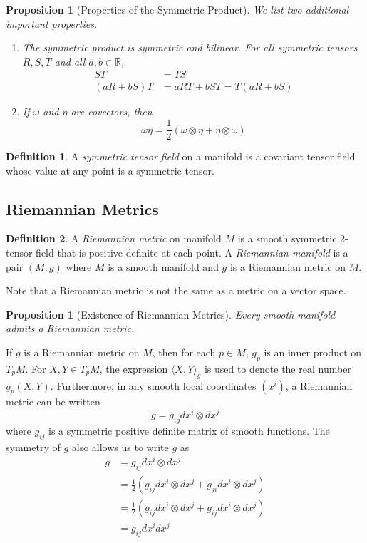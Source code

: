 \documentclass{article}
\newtheorem{proposition}[theorem]{Proposition}
\theoremstyle{remark}
\theoremstyle{definition}
\newtheorem{definition}{Definition}[section]
\begin{document}
\begin{proposition}[Properties of the Symmetric Product]
We list two additional important properties. 
\begin{enumerate}
    \item The symmetric product is symmetric and bilinear. For all symmetric tensors $R, S, T$ and all $a, b \in \mathbb{R}$, 
    \begin{align*}
        ST & = TS \\
        (a R + b S) T & = a RT + b ST= T (a R + bS) 
    \end{align*}
    \item If $\omega$ and $\eta$ are covectors, then 
    \[\omega \eta = \frac{1}{2} (\omega \otimes \eta + \eta \otimes \omega)\]
\end{enumerate}
\end{proposition}

\begin{definition}
A \textit{symmetric tensor field} on a manifold is a covariant tensor field whose value at any point is a symmetric tensor. 
\end{definition}

\subsection{Riemannian Metrics}
\begin{definition}
A \textit{Riemannian metric} on manifold $M$ is a smooth symmetric 2-tensor field that is positive definite at each point. A \textit{Riemannian manifold} is a pair $(M, g)$ where $M$ is a smooth manifold and $g$ is a Riemannian metric on $M$. 
\end{definition}

Note that a Riemannian metric is not the same as a metric on a vector space. 

\begin{proposition}[Existence of Riemannian Metrics]
Every smooth manifold admits a Riemannian metric. 
\end{proposition}

If $g$ is a Riemannian metric on $M$, then for each $p \in M$, $g_p$ is an inner product on $T_p M$. For $X, Y \in T_p M$, the expression $\langle X, Y \rangle_g$ is used to denote the real number $g_p (X, Y)$. Furthermore, in any smooth local coordinates $(x^i)$, a Riemannian metric can be written 
\[g = g_{i g} dx^i \otimes dx^j\]
where $g_{ij}$ is a symmetric positive definite matrix of smooth functions. The symmetry of $g$ also allows us to write $g$ as 
\begin{align*}
    g & = g_{ij} dx^i \otimes dx^j \\
    & = \frac{1}{2} (g_{ij} dx^i \otimes dx^j + g_{ji} dx^i \otimes dx^j) \\
    & = \frac{1}{2} (g_{ij} dx^i \otimes dx^j + g_{ij} dx^i \otimes dx^j) \\
    & = g_{ij} dx^i dx^j 
\end{align*}
\end{document}
